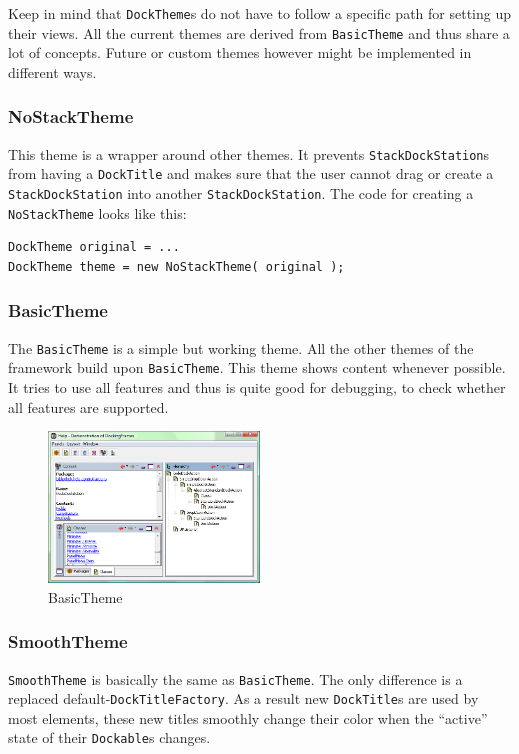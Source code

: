 \documentclass[a4paper,10pt]{article}
\newcommand{\src}[1]{\texttt{#1}}
\begin{document}
Keep in mind that \src{DockTheme}s do not have to follow a specific path for setting up their views. All the current themes are derived from \src{BasicTheme} and thus share a lot of concepts. Future or custom themes however might be implemented in different ways.

\subsubsection{NoStackTheme}
This theme is a wrapper around other themes. It prevents \src{StackDockStation}s from having a \src{DockTitle} and makes sure that the user cannot drag or create a \src{StackDockStation} into another \src{StackDockStation}. The code for creating a \src{NoStackTheme} looks like this:
\begin{lstlisting}
DockTheme original = ...
DockTheme theme = new NoStackTheme( original );
\end{lstlisting}

\subsubsection{BasicTheme}
The \src{BasicTheme} is a simple but working theme. All the other themes of the framework build upon \src{BasicTheme}. This theme shows content whenever possible. It tries to use all features and thus is quite good for debugging, to check whether all features are supported.

\begin{figure}[ht]
\centering
\includegraphics[width=0.5\textwidth]{theme_default}
\caption{BasicTheme}
\label{fig:theme_flat}
\end{figure}

\subsubsection{SmoothTheme}
\src{SmoothTheme} is basically the same as \src{BasicTheme}. The only difference is a replaced default-\src{DockTitleFactory}. As a result new \src{DockTitle}s are used by most elements, these new titles smoothly change their color when the ``active'' state of their \src{Dockable}s changes.
\end{document}
